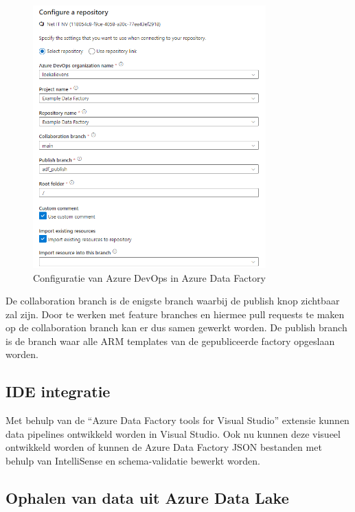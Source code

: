 
\begin{figure}[H]
    \centering
    \includegraphics[width=0.8\textwidth]{./graphics/adf/setup_repository_3_specific.png}
    \caption{Configuratie van Azure DevOps in Azure Data Factory}
\end{figure}

De collaboration branch is de enigste branch waarbij de publish knop zichtbaar zal zijn. Door te werken met feature branches en hiermee pull requests te maken op de collaboration branch kan er dus samen gewerkt worden. De publish branch is de branch waar alle ARM templates van de gepubliceerde factory opgeslaan worden.


\subsection{IDE integratie}

Met behulp van de ``Azure Data Factory tools for Visual Studio'' extensie kunnen data pipelines ontwikkeld worden in Visual Studio. Ook nu kunnen deze visueel ontwikkeld worden of kunnen de Azure Data Factory JSON bestanden met behulp van IntelliSense en schema-validatie bewerkt worden.

\subsection{Ophalen van data uit Azure Data Lake}

